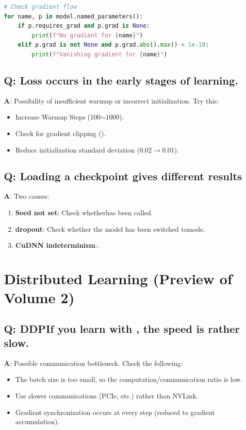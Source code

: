 \begin{lstlisting}[language=Python]
# Check gradient flow
for name, p in model.named_parameters():
    if p.requires_grad and p.grad is None:
        print(f"No gradient for {name}")
    elif p.grad is not None and p.grad.abs().max() < 1e-10:
        print(f"Vanishing gradient for {name}")
\end{lstlisting}

\subsection{Q: Loss occurs in the early stages of learning.}

\textbf{A}: Possibility of insufficient warmup or incorrect initialization. Try this:
\begin{itemize}
\item Increase Warmup Steps (100$\sim$1000).
\item Check for gradient clipping ().
\item Reduce initialization standard deviation (0.02$\to$0.01).
\end{itemize}

\subsection{Q: Loading a checkpoint gives different results}

\textbf{A}: Two causes:
\begin{enumerate}
\item\textbf{Seed not set}: Check whetherhas been called.
\item\textbf{dropout}: Check whether the model has been switched tomode.
\item\textbf{CuDNN indeterminism}:.
\end{enumerate}

\section{Distributed Learning (Preview of Volume 2)}

\subsection{Q: DDPIf you learn with , the speed is rather slow.}

\textbf{A}: Possible communication bottleneck. Check the following:
\begin{itemize}
\item The batch size is too small, so the computation/communication ratio is low.
\item Use slower communications (PCIe, etc.) rather than NVLink.
\item Gradient synchronization occurs at every step (reduced to gradient accumulation).
\end{itemize}

